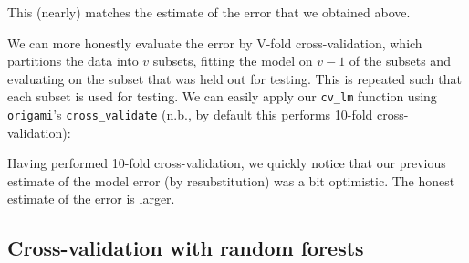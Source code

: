 \documentclass[12pt, krantz2,]{book}
\newenvironment{Shaded}{\begin{snugshade}}{\end{snugshade}}
\newcommand{\CommentTok}[1]{\textcolor[rgb]{0.56,0.35,0.01}{\textit{#1}}}
\newcommand{\DataTypeTok}[1]{\textcolor[rgb]{0.13,0.29,0.53}{#1}}
\newcommand{\DecValTok}[1]{\textcolor[rgb]{0.00,0.00,0.81}{#1}}
\newcommand{\KeywordTok}[1]{\textcolor[rgb]{0.13,0.29,0.53}{\textbf{#1}}}
\newcommand{\NormalTok}[1]{#1}
\newcommand{\OperatorTok}[1]{\textcolor[rgb]{0.81,0.36,0.00}{\textbf{#1}}}
\newcommand{\OtherTok}[1]{\textcolor[rgb]{0.56,0.35,0.01}{#1}}
\newcommand{\StringTok}[1]{\textcolor[rgb]{0.31,0.60,0.02}{#1}}
\theoremstyle{definition}
\theoremstyle{definition}
\theoremstyle{definition}
\newcommand{\1}{\mathbbm{1}}
\begin{document}
\begin{Shaded}
\end{Shaded}

This (nearly) matches the estimate of the error that we obtained above.

We can more honestly evaluate the error by V-fold cross-validation, which
partitions the data into \(v\) subsets, fitting the model on \(v - 1\) of the
subsets and evaluating on the subset that was held out for testing. This is
repeated such that each subset is used for testing. We can easily apply our
\texttt{cv\_lm} function using \texttt{origami}'s \texttt{cross\_validate} (n.b., by default this
performs 10-fold cross-validation):

\begin{Shaded}
\end{Shaded}

Having performed 10-fold cross-validation, we quickly notice that our previous
estimate of the model error (by resubstitution) was a bit optimistic. The honest
estimate of the error is larger.

\hypertarget{cross-validation-with-random-forests}{%
\subsection{Cross-validation with random forests}\label{cross-validation-with-random-forests}}
\end{document}
